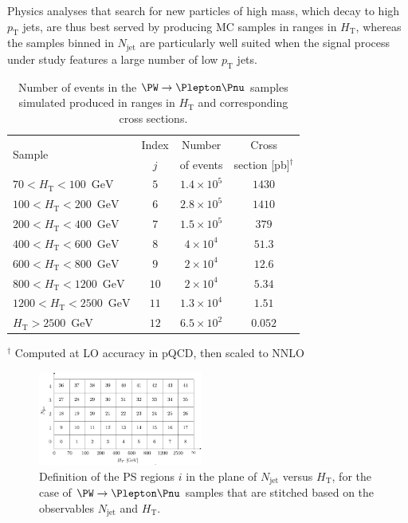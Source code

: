 \documentclass[twocolumn,epjc3]{svjour3}
\newcommand{\pT}{\ensuremath{p_{\textrm{T}}}\xspace}
\newcommand{\HT}{\ensuremath{H_{\mathrm{T}}}\xspace}
\newcommand{\GeV}{\ensuremath{\textrm{GeV}}\xspace}
\newcommand{\jet}{\ensuremath{\textrm{jet}}\xspace}
\begin{document}
Physics analyses that search for new particles of high mass, which decay to high $\pT$ jets, are thus best served by producing MC samples in ranges in $\HT$,
whereas the samples binned in $N_{\jet}$ are particularly well suited when the signal process under study features a large number of low $\pT$ jets.

\begin{table}
\caption{
  Number of events in the $\PW \to \Plepton\Pnu$ samples simulated produced in ranges in $\HT$ and corresponding cross sections.
}
\label{tab:samples_WJets_vs_Njet_and_HT}
\begin{center}
\begin{tabular}{l|c|c|c}
\hline
\multirow{2}{20mm}{Sample} & Index & Number    & Cross                    \\
                           & $j$   & of events & section [pb]$^{\dagger}$ \\
\hline
$  70 < \HT <  100$~\GeV   &  $5$  & $1.4 \times 10^{5}$ & $1430$  \\
$ 100 < \HT <  200$~\GeV   &  $6$  & $2.8 \times 10^{5}$ & $1410$  \\
$ 200 < \HT <  400$~\GeV   &  $7$  & $1.5 \times 10^{5}$ & $379$   \\
$ 400 < \HT <  600$~\GeV   &  $8$  & $  4 \times 10^{4}$ & $51.3$  \\
$ 600 < \HT <  800$~\GeV   &  $9$  & $  2 \times 10^{4}$ & $12.6$  \\
$ 800 < \HT < 1200$~\GeV   & $10$  & $  2 \times 10^{4}$ & $5.34$  \\
$1200 < \HT < 2500$~\GeV   & $11$  & $1.3 \times 10^{4}$ & $1.51$  \\
$       \HT > 2500$~\GeV   & $12$  & $6.5 \times 10^{2}$ & $0.052$ \\
\hline
\end{tabular}
\end{center}
$^{\dagger}$ Computed at LO accuracy in pQCD, then scaled to NNLO
\end{table}

\begin{figure}
\includegraphics[width=0.48\textwidth]{plots/regions_WJets_vs_Njet_and_HT.pdf}
\caption{
  Definition of the PS regions $i$ in the plane of $N_{\jet}$ versus $\HT$,
  for the case of $\PW \to \Plepton\Pnu$ samples that are stitched based on the observables $N_{\jet}$ and $\HT$.
}
\label{fig:regions_WJets_vs_Njet_and_HT}
\end{figure}
\end{document}

